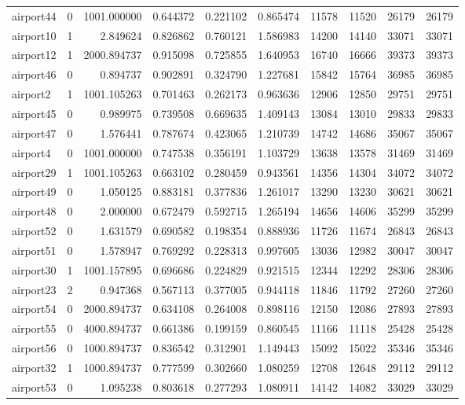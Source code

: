 \begin{longtable}{|l|r|r|r|r|r|r|r|r|r|}
airport44 & 0 & 1001.000000 & 0.644372 & 0.221102 & 0.865474 & 11578 & 11520 & 26179 & 26179 \\
airport10 & 1 & 2.849624 & 0.826862 & 0.760121 & 1.586983 & 14200 & 14140 & 33071 & 33071 \\
airport12 & 1 & 2000.894737 & 0.915098 & 0.725855 & 1.640953 & 16740 & 16666 & 39373 & 39373 \\
airport46 & 0 & 0.894737 & 0.902891 & 0.324790 & 1.227681 & 15842 & 15764 & 36985 & 36985 \\
airport2 & 1 & 1001.105263 & 0.701463 & 0.262173 & 0.963636 & 12906 & 12850 & 29751 & 29751 \\
airport45 & 0 & 0.989975 & 0.739508 & 0.669635 & 1.409143 & 13084 & 13010 & 29833 & 29833 \\
airport47 & 0 & 1.576441 & 0.787674 & 0.423065 & 1.210739 & 14742 & 14686 & 35067 & 35067 \\
airport4 & 0 & 1001.000000 & 0.747538 & 0.356191 & 1.103729 & 13638 & 13578 & 31469 & 31469 \\
airport29 & 1 & 1001.105263 & 0.663102 & 0.280459 & 0.943561 & 14356 & 14304 & 34072 & 34072 \\
airport49 & 0 & 1.050125 & 0.883181 & 0.377836 & 1.261017 & 13290 & 13230 & 30621 & 30621 \\
airport48 & 0 & 2.000000 & 0.672479 & 0.592715 & 1.265194 & 14656 & 14606 & 35299 & 35299 \\
airport52 & 0 & 1.631579 & 0.690582 & 0.198354 & 0.888936 & 11726 & 11674 & 26843 & 26843 \\
airport51 & 0 & 1.578947 & 0.769292 & 0.228313 & 0.997605 & 13036 & 12982 & 30047 & 30047 \\
airport30 & 1 & 1001.157895 & 0.696686 & 0.224829 & 0.921515 & 12344 & 12292 & 28306 & 28306 \\
airport23 & 2 & 0.947368 & 0.567113 & 0.377005 & 0.944118 & 11846 & 11792 & 27260 & 27260 \\
airport54 & 0 & 2000.894737 & 0.634108 & 0.264008 & 0.898116 & 12150 & 12086 & 27893 & 27893 \\
airport55 & 0 & 4000.894737 & 0.661386 & 0.199159 & 0.860545 & 11166 & 11118 & 25428 & 25428 \\
airport56 & 0 & 1000.894737 & 0.836542 & 0.312901 & 1.149443 & 15092 & 15022 & 35346 & 35346 \\
airport32 & 1 & 1000.894737 & 0.777599 & 0.302660 & 1.080259 & 12708 & 12648 & 29112 & 29112 \\
airport53 & 0 & 1.095238 & 0.803618 & 0.277293 & 1.080911 & 14142 & 14082 & 33029 & 33029 \\

\end{longtable}
